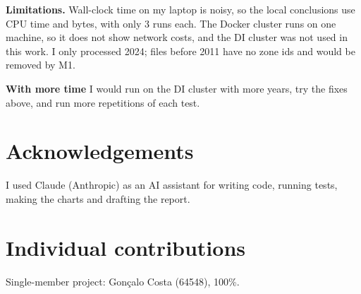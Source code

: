 \documentclass[sigconf]{acmart}
\begin{document}
\textbf{Limitations.} Wall-clock time on my laptop is noisy, so the local
conclusions use CPU time and bytes, with only 3 runs each. The Docker cluster
runs on one machine, so it does not show network costs, and the DI cluster was
not used in this work. I only processed 2024; files before 2011 have no zone
ids and would be removed by M1.

\textbf{With more time} I would run on the DI cluster with more years, try the
fixes above, and run more repetitions of each test.

\section*{Acknowledgements}
I used Claude (Anthropic) as an AI assistant for writing code, running tests,
making the charts and drafting the report.

\section*{Individual contributions}
Single-member project: Gonçalo Costa (64548), 100\%.



\end{document}
